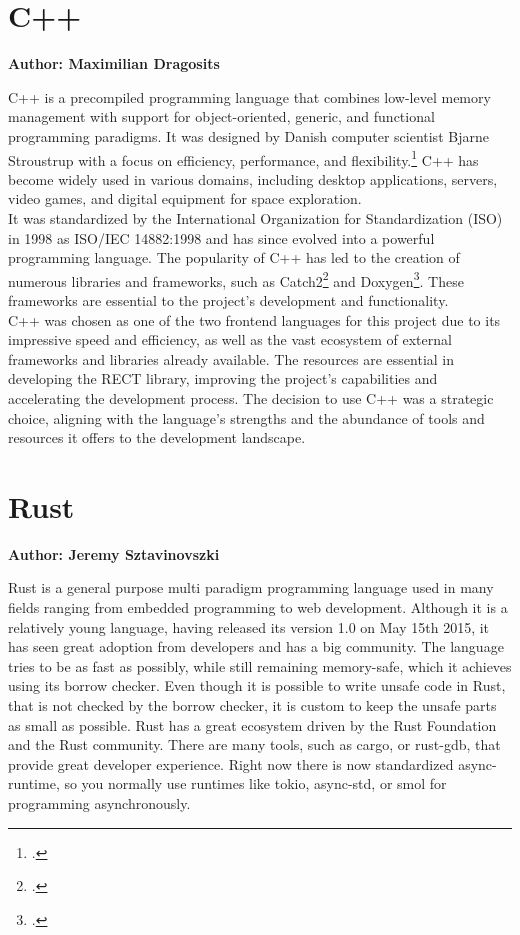 \section{C++}
\textbf{Author: Maximilian Dragosits}

C++ is a precompiled programming language that combines low-level memory management with support for object-oriented, generic, and functional programming paradigms. 
It was designed by Danish computer scientist Bjarne Stroustrup with a focus on efficiency, performance, and flexibility.\footcite{lecture_essence_cpp} C++ has 
become widely used in various domains, including desktop applications, servers, video games, and digital equipment for space exploration.\\

It was standardized by the International Organization for Standardization (ISO) in 1998 as ISO/IEC 14882:1998 and has since evolved into a powerful programming 
language. The popularity of C++ has led to the creation of numerous libraries and frameworks, such as Catch2\footcite{catch2_git} and Doxygen\footcite{doxygen_main_site}. 
These frameworks are essential to the project's development and functionality.\\

C++ was chosen as one of the two frontend languages for this project due to its impressive speed and efficiency, as well as the vast ecosystem of external 
frameworks and libraries already available. The resources are essential in developing the RECT library, improving the project's capabilities and accelerating 
the development process. The decision to use C++ was a strategic choice, aligning with the language's strengths and the abundance of tools and resources it 
offers to the development landscape.

\section{Rust}
\textbf{Author: Jeremy Sztavinovszki}

Rust is a general purpose multi paradigm programming language used in many fields ranging from embedded programming to web development. Although it is a relatively young language, having released its version 1.0 on May 15th 2015, it has seen great adoption from developers and has a big community. The language tries to be as fast as possibly, while still remaining memory-safe, which it achieves using its borrow checker. Even though it is possible to write unsafe code in Rust, that is not checked by the borrow checker, it is custom to keep the unsafe parts as small as possible.
Rust has a great ecosystem driven by the Rust Foundation and the Rust community. There are many tools, such as cargo, or rust-gdb, that provide great developer experience.
Right now there is now standardized async-runtime, so you normally use runtimes like tokio, async-std, or smol for programming asynchronously.

